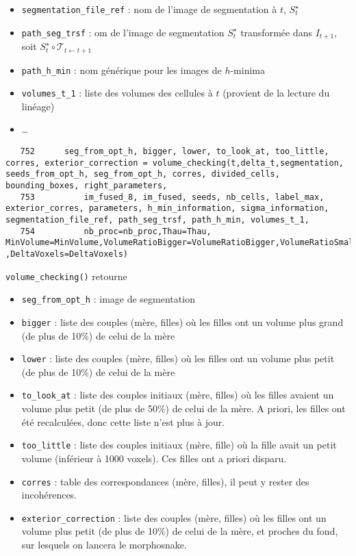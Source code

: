 \documentclass{article}
\def \mycolor {red}
\begin{document}
\begin{itemize}
\item \verb|segmentation_file_ref| : nom de l'image de segmentation \`a $t$, $S^{\star}_t$
\item \verb|path_seg_trsf| : om de l'image de segmentation $S^{\star}_t$ transform\'ee dans $I_{t+1}$, soit
$S^{\star}_t \circ \mathcal{T}_{t \leftarrow t+1}$
\item \verb|path_h_min| : nom g\'en\'erique pour les images de $h$-minima
\item \verb|volumes_t_1| : liste des volumes des cellules \`a $t$ (provient de la lecture du lin\'eage)
\item \ldots
\end{itemize}
\color{black}
\begin{verbatim} 
   752	    seg_from_opt_h, bigger, lower, to_look_at, too_little, corres, exterior_correction = volume_checking(t,delta_t,segmentation, seeds_from_opt_h, seg_from_opt_h, corres, divided_cells, bounding_boxes, right_parameters, 
   753	        im_fused_8, im_fused, seeds, nb_cells, label_max, exterior_corres, parameters, h_min_information, sigma_information, segmentation_file_ref, path_seg_trsf, path_h_min, volumes_t_1, 
   754	        nb_proc=nb_proc,Thau=Thau, MinVolume=MinVolume,VolumeRatioBigger=VolumeRatioBigger,VolumeRatioSmaller=VolumeRatioSmaller,MorphosnakeIterations=MorphosnakeIterations,NIterations=NIterations ,DeltaVoxels=DeltaVoxels)
\end{verbatim}
\color{\mycolor}
\texttt{volume\_checking()} retourne
\begin{itemize}
\itemsep -0.5ex
\item \verb|seg_from_opt_h| : image de segmentation
\item \verb|bigger| : liste des couples (m\`ere, filles) o\`u les filles ont un volume plus grand (de plus de 10\%) de celui de la m\`ere
\item \verb|lower| : liste des couples (m\`ere, filles) o\`u les filles ont un volume plus petit (de plus de 10\%) de celui de la m\`ere
\item \verb|to_look_at| : liste des couples initiaux (m\`ere, filles) o\`u les filles avaient un volume plus petit (de plus de 50\%) de celui de la m\`ere. A priori, les filles ont \'et\'e recalcul\'ees, donc cette liste n'est plus \`a jour.
\item \verb|too_little| : liste des couples initiaux (m\`ere, fille) o\`u la fille avait un petit volume (inf\'erieur \`a 1000 voxels). Ces filles ont a priori disparu.
\item \verb|corres| : table des correspondances (m\`ere, filles), il peut y rester des incoh\'erences.
\item \verb|exterior_correction| : liste des couples (m\`ere, filles) o\`u les filles ont un volume plus petit (de plus de 10\%) de celui de la m\`ere, et proches du fond, sur lesquels on lancera le morphosnake.
\end{itemize}
\end{document}
